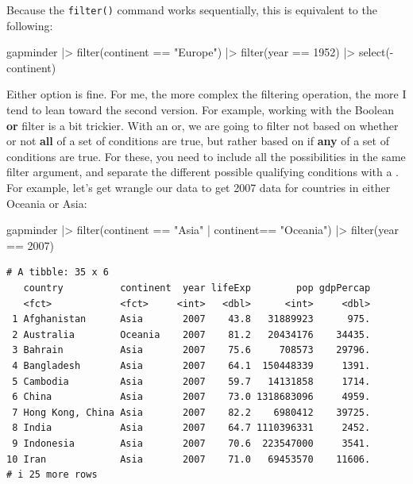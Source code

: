\documentclass[
  letterpaper,
]{book}
\newenvironment{Shaded}{\begin{snugshade}}{\end{snugshade}}
\newcommand{\DecValTok}[1]{\textcolor[rgb]{0.68,0.00,0.00}{#1}}
\newcommand{\FunctionTok}[1]{\textcolor[rgb]{0.28,0.35,0.67}{#1}}
\newcommand{\NormalTok}[1]{\textcolor[rgb]{0.00,0.23,0.31}{#1}}
\newcommand{\SpecialCharTok}[1]{\textcolor[rgb]{0.37,0.37,0.37}{#1}}
\newcommand{\StringTok}[1]{\textcolor[rgb]{0.13,0.47,0.30}{#1}}
\begin{document}
Because the \texttt{filter()} command works sequentially, this is
equivalent to the following:

\begin{Shaded}
\begin{Highlighting}[]
\NormalTok{gapminder }\SpecialCharTok{|\textgreater{}} 
  \FunctionTok{filter}\NormalTok{(continent }\SpecialCharTok{==} \StringTok{"Europe"}\NormalTok{) }\SpecialCharTok{|\textgreater{}} 
  \FunctionTok{filter}\NormalTok{(year }\SpecialCharTok{==} \DecValTok{1952}\NormalTok{) }\SpecialCharTok{|\textgreater{}} 
  \FunctionTok{select}\NormalTok{(}\SpecialCharTok{{-}}\NormalTok{continent)}
\end{Highlighting}
\end{Shaded}

Either option is fine. For me, the more complex the filtering operation,
the more I tend to lean toward the second version. For example, working
with the Boolean \textbf{or} filter is a bit trickier. With an or, we
are going to filter not based on whether or not \textbf{all} of a set of
conditions are true, but rather based on if \textbf{any} of a set of
conditions are true. For these, you need to include all the
possibilities in the same filter argument, and separate the different
possible qualifying conditions with a \texttt{\textbar{}}. For example,
let's get wrangle our data to get 2007 data for countries in either
Oceania or Asia:

\begin{Shaded}
\begin{Highlighting}[]
\NormalTok{gapminder }\SpecialCharTok{|\textgreater{}} 
  \FunctionTok{filter}\NormalTok{(continent }\SpecialCharTok{==} \StringTok{"Asia"} \SpecialCharTok{|}\NormalTok{ continent}\SpecialCharTok{==} \StringTok{"Oceania"}\NormalTok{) }\SpecialCharTok{|\textgreater{}} 
  \FunctionTok{filter}\NormalTok{(year }\SpecialCharTok{==} \DecValTok{2007}\NormalTok{)}
\end{Highlighting}
\end{Shaded}

\begin{verbatim}
# A tibble: 35 x 6
   country          continent  year lifeExp        pop gdpPercap
   <fct>            <fct>     <int>   <dbl>      <int>     <dbl>
 1 Afghanistan      Asia       2007    43.8   31889923      975.
 2 Australia        Oceania    2007    81.2   20434176    34435.
 3 Bahrain          Asia       2007    75.6     708573    29796.
 4 Bangladesh       Asia       2007    64.1  150448339     1391.
 5 Cambodia         Asia       2007    59.7   14131858     1714.
 6 China            Asia       2007    73.0 1318683096     4959.
 7 Hong Kong, China Asia       2007    82.2    6980412    39725.
 8 India            Asia       2007    64.7 1110396331     2452.
 9 Indonesia        Asia       2007    70.6  223547000     3541.
10 Iran             Asia       2007    71.0   69453570    11606.
# i 25 more rows
\end{verbatim}
\end{document}
